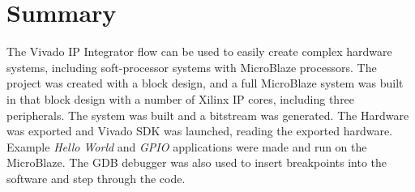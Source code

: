 \documentclass[11pt]{article}
\begin{document}
\section{Summary}
\label{sec:summary}
The Vivado IP Integrator flow can be used to easily create complex hardware systems, including soft-processor systems with MicroBlaze processors. The project was created with a block design, and a full MicroBlaze system was built in that block design with a number of Xilinx IP cores, including three peripherals. The system was built and a bitstream was generated. The Hardware was exported and Vivado SDK was launched, reading the exported hardware. Example \textit{Hello World} and \textit{GPIO} applications were made and run on the MicroBlaze. The GDB debugger was also used to insert breakpoints into the software and step through the code.



\end{document}
